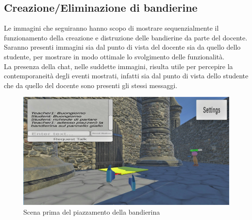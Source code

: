 \subsection{Creazione/Eliminazione di bandierine}
Le immagini che seguiranno hanno scopo di mostrare sequenzialmente il funzionamento della creazione e distruzione delle bandierine da parte del docente.
\\Saranno presenti immagini sia dal punto di vista del docente sia da quello dello studente, per mostrare in modo ottimale lo svolgimento delle funzionalità.
\\La presenza della chat, nelle suddette immagini, risulta utile per percepire la contemporaneità degli eventi mostrati, infatti sia dal punto di vista dello studente che da quello del docente sono presenti gli stessi messaggi.
\begin{figure}[H]
\centering
\includegraphics[scale = 0.25]{Immagini/Dimostrazioni d'uso/piazzobandierina.jpg}
\caption{Scena prima del piazzamento della bandierina}
\end{figure}
